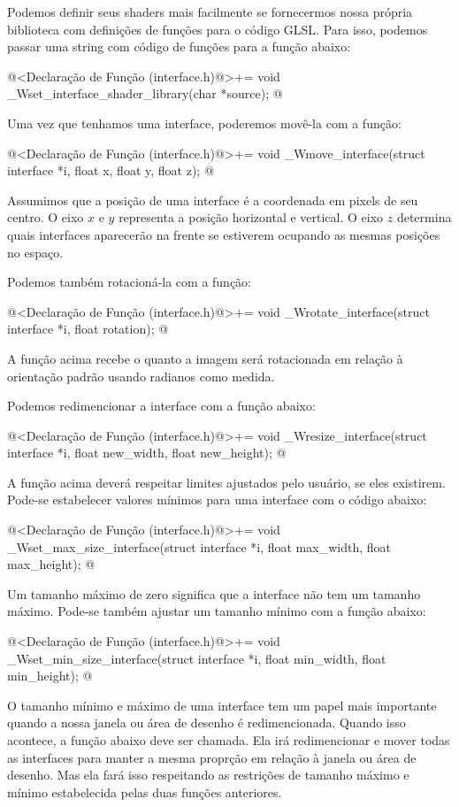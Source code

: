 Podemos definir seus shaders mais facilmente se fornecermos nossa
própria biblioteca com definições de funções para o código GLSL. Para
isso, podemos passar uma string com código de funções para a função
abaixo:

\iniciocodigo
@<Declaração de Função (interface.h)@>+=
void _Wset_interface_shader_library(char *source);
@
\fimcodigo

Uma vez que tenhamos uma interface, poderemos movê-la com a função:

\iniciocodigo
@<Declaração de Função (interface.h)@>+=
void _Wmove_interface(struct interface *i, float x, float y, float z);
@
\fimcodigo

Assumimos que a posição de uma interface é a coordenada em pixels de
seu centro. O eixo $x$ e $y$ representa a posição horizontal e
vertical. O eixo $z$ determina quais interfaces aparecerão na frente
se estiverem ocupando as mesmas posições no espaço.

Podemos também rotacioná-la com a função:

\iniciocodigo
@<Declaração de Função (interface.h)@>+=
void _Wrotate_interface(struct interface *i, float rotation);
@
\fimcodigo

A função acima recebe o quanto a imagem será rotacionada em relação à
orientação padrão usando radianos como medida.

Podemos redimencionar a interface com a função abaixo:

\iniciocodigo
@<Declaração de Função (interface.h)@>+=
void _Wresize_interface(struct interface *i, float new_width, float new_height);
@
\fimcodigo

A função acima deverá respeitar limites ajustados pelo usuário, se
eles existirem. Pode-se estabelecer valores mínimos para uma interface
com o código abaixo:

\iniciocodigo
@<Declaração de Função (interface.h)@>+=
void _Wset_max_size_interface(struct interface *i, float max_width,
                              float max_height);
@
\fimcodigo

Um tamanho máximo de zero significa que a interface não tem um tamanho
máximo. Pode-se também ajustar um tamanho mínimo com a função abaixo:

\iniciocodigo
@<Declaração de Função (interface.h)@>+=
void _Wset_min_size_interface(struct interface *i, float min_width,
                              float min_height);
@
\fimcodigo

O tamanho mínimo e máximo de uma interface tem um papel mais
importante quando a nossa janela ou área de desenho é
redimencionada. Quando isso acontece, a função abaixo deve ser
chamada. Ela irá redimencionar e mover todas as interfaces para manter
a mesma proprção em relação à janela ou área de desenho. Mas ela fará
isso respeitando as restrições de tamanho máximo e mínimo estabelecida
pelas duas funções anteriores.


